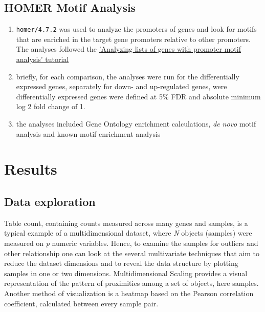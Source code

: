 \documentclass[12pt]{article}
\newcommand{\homer}{\texttt{homer/4.7.2}}
\begin{document}
\subsection{HOMER Motif Analysis}
\begin{enumerate}
  \item {\homer} was used to analyze the promoters of genes and look for motifs that are enriched in the target gene promoters relative to other promoters. The analyses followed the \href{http://homer.salk.edu/homer/motif/index.html}{'Analyzing lists of genes with promoter motif analysis' tutorial}
  \item briefly, for each comparison, the analyses were run for the differentially expressed genes, separately for down- and up-regulated genes, were differentially expressed genes were defined at 5\% FDR and absolute minimum log 2 fold change of 1. 
  \item the analyses included Gene Ontology enrichment calculations, \textit{de novo} motif analysis and known motif enrichment analysis
\end{enumerate}



\section{Results}
\subsection{Data exploration}
Table count, containing counts measured across many genes and samples, is a typical example of a multidimensional dataset, where \textit{N} objects (samples) were measured on \textit{p} numeric variables. Hence, to examine the samples for outliers and other relationship one can look at the several multivariate techniques that aim to reduce the dataset dimensions and to reveal the data structure by plotting samples in one or two dimensions. Multidimensional Scaling provides a visual representation of the pattern of proximities among a set of objects, here samples. Another method of visualization is a heatmap based on the Pearson correlation coefficient, calculated between every sample pair. 


\end{document}
